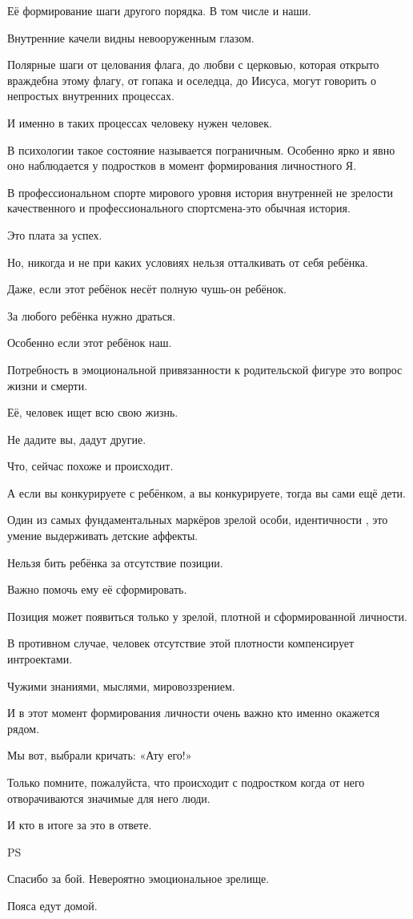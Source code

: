 Её формирование шаги другого порядка. В том числе и наши.

Внутренние качели видны невооруженным глазом.

Полярные шаги от целования флага, до любви с церковью, которая открыто
враждебна этому флагу, от гопака и оселедца, до Иисуса, могут говорить о
непростых внутренних процессах.

И именно в таких процессах человеку нужен человек.

В психологии такое состояние называется пограничным. Особенно ярко и явно оно
наблюдается у подростков в момент формирования личностного Я.

В профессиональном спорте мирового уровня история внутренней не зрелости
качественного и профессионального спортсмена-это обычная история. 

Это плата за успех.

Но, никогда и не при каких условиях нельзя отталкивать от себя ребёнка.

Даже, если этот ребёнок несёт полную чушь-он ребёнок.

За любого ребёнка нужно драться. 

Особенно если этот ребёнок наш.

Потребность в эмоциональной привязанности к родительской фигуре это вопрос
жизни и смерти. 

Её, человек ищет всю свою жизнь.

Не дадите вы, дадут другие.

Что, сейчас похоже и происходит.

А если вы конкурируете с ребёнком, а вы конкурируете, тогда вы сами ещё дети.

Один из самых фундаментальных маркёров зрелой особи,  идентичности , это умение
выдерживать детские аффекты.

Нельзя бить ребёнка за отсутствие позиции. 

Важно помочь ему её сформировать. 

Позиция может появиться только у зрелой, плотной и сформированной личности.

В противном случае, человек отсутствие этой плотности компенсирует интроектами.

Чужими знаниями, мыслями, мировоззрением.

И в этот момент формирования личности очень важно кто именно окажется рядом.

Мы вот, выбрали кричать: «Ату его!»

Только помните, пожалуйста, что происходит с подростком когда от него
отворачиваются значимые для него люди.

И кто в итоге за это в ответе.

PS

Спасибо за бой. Невероятно эмоциональное зрелище.

Пояса едут домой.
